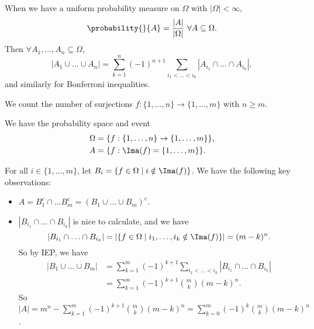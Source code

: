 When we have a uniform probability measure on \(\Omega\) with \(\left\vert \Omega \right\vert < \infty\),
\[
    \probability{}{A} =\frac{\left\vert A \right\vert}{\left\vert \Omega \right\vert }~\forall A \subseteq \Omega.
\]
Then \(\forall A_1, \ldots, A_n \subseteq \Omega \),
\[
    \left\vert A_1 \cup \ldots \cup A_n \right\vert = \sum\limits_{k=1}^{n} (-1)^{n+1}\sum\limits_{i_1< \ldots < i_k }\left\vert A_{i_1}\cap \ldots \cap A_{i_k}  \right\vert,
\]
and similarly for Bonferroni inequalities.

\begin{example}
    We count the number of surjections \(f: \{1, \ldots, n\}\to \{1, \ldots ,m \}\) with \(n \geq m\).

    We have the probability space and event
    \begin{align*}
        \Omega &= \{f:\{1, \ldots ,n\}\to \{1, \ldots , m \}\},\\
        A &= \{f: \Ima(f) = \{1, \ldots , m \}\}.
    \end{align*}

    For all \(i \in \{1, \ldots ,m \}\), let \(B_i = \{f\in \Omega\mid i \notin \Ima(f)\}\). We have the following key observations:
    \begin{itemize}
        \item \(A = B_1^c \cap \ldots B_m^c = (B_1 \cup \ldots \cup B_m )^c \).
        \item \(\left\vert B_{i_1}\cap \ldots \cap B_{i_k} \right\vert \) is nice to calculate, and we have
        \[
            \left\vert B_{i_1}\cap \ldots \cap B_{i_k}  \right\vert = \left\vert \{f\in \Omega\mid i_1, \ldots, i_k \notin \Ima(f) \} \right\vert = (m-k)^n.
        \]
        So by IEP, we have 
        \begin{align*}
            \left\vert B_1 \cup \ldots \cup B_m \right\vert &= \sum\limits_{k=1}^{m} (-1)^{k+1}\sum\limits_{i_1<\ldots<i_{k}} \left\vert B_{i_1}\cap \ldots \cap B_{i_k}\right\vert\\
            &= \sum\limits_{k=1}^{m} (-1)^{k+1} \binom{m}{k}(m-k)^n.
        \end{align*}
        So \(\left\vert A \right\vert = m^n - \sum\limits_{k=1}^{m} (-1)^{k+1}\binom{m}{k}(m-k)^n = \sum\limits_{k=0}^{m} (-1)^k \binom{m}{k}(m-k)^n\).
    \end{itemize}
\end{example}

